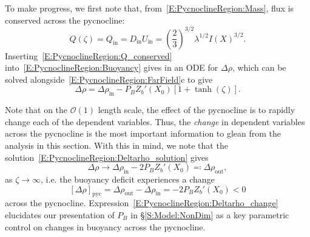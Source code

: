 \documentclass{jfm}
\newcommand{\order}[1]{\mathcal{O}(#1)}
\newcommand{\Pb}{\textit{P}_B}  %
\renewcommand{\in}{\text{in}} %
\newcommand{\out}{\text{out}}
\begin{document}
To make progress, we first note that, from~\eqref{E:PycnoclineRegion:Mass}, flux is conserved across the pycnocline:
\begin{equation}\label{E:PycnoclineRegion:Q_conserved}
Q(\zeta) = Q_{\in} = D_{\in} U_{\in}  =\left(\frac{2}{3}\right)^{3/2} \lambda^{1/2}I(X)^{3/2}.
\end{equation}
Inserting~\eqref{E:PycnoclineRegion:Q_conserved} into~\eqref{E:PycnoclineRegion:Buoyancy} gives in an ODE for $\Delta \rho$, which can be solved alongside~\eqref{E:PycnoclineRegion:FarField}c to give
\begin{equation}\label{E:PycnoclineRegion:Deltarho_solution}
\Delta \rho = \Delta \rho_{\in} - \Pb Z_b'(X_0) \left[1 + \tanh(\zeta)\right].
\end{equation} 

Note that on the $\order{1}$ length scale, the effect of the pycnocline is to rapidly change each of the dependent variables. Thus, the \textit{change} in dependent variables across the pycnocline is the most important information to glean from the analysis in this section. With this in mind, we note that the solution~\eqref{E:PycnoclineRegion:Deltarho_solution} gives
\begin{equation}\label{E:PycnoclineRegion:Deltarho_limit}
\Delta \rho \to \Delta \rho_{\in} - 2 \Pb Z_b'(X_0)  \eqcolon \Delta \rho_\out,
\end{equation}
as $\zeta \to \infty$, i.e. the buoyancy deficit experiences a change
\begin{equation}\label{E:PycnoclineRegion:Deltarho_change}
\left[\Delta \rho\right]_{\text{pyc}} = \Delta \rho_\out - \Delta \rho_\in = - 2 \Pb Z_b'(X_0) < 0
\end{equation}
across the pycnocline. Expression~\eqref{E:PycnoclineRegion:Deltarho_change} elucidates our presentation of $\Pb$ in \S\ref{S:Model:NonDim} as a key parametric control on changes in buoyancy across the pycnocline.
\end{document}
